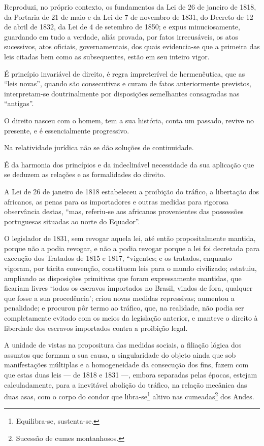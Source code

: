 {\asterisc

Reproduzi, no próprio contexto, os fundamentos da Lei de 26 de janeiro
de 1818, da Portaria de 21 de maio e da Lei de 7 de novembro de 1831, do
Decreto de 12 de abril de 1832, da Lei de 4 de setembro de 1850; e expus
minuciosamente, guardando em tudo a verdade, aliás provada, por fatos
irrecusáveis, os atos sucessivos, atos oficiais, governamentais, dos
quais evidencia-se que a primeira das leis citadas bem como as
subsequentes, estão em seu inteiro vigor.

É princípio invariável de direito, é regra impreterível de hermenêutica,
que as ``leis novas'', quando são consecutivas e curam de fatos
anteriormente previstos, interpretam-se doutrinalmente por disposições
semelhantes consagradas nas ``antigas''.

O direito nasceu com o homem, tem a sua história, conta um passado,
revive no presente, e é essencialmente progressivo.

Na relatividade jurídica não se dão soluções de continuidade.

É da harmonia dos princípios e da indeclinável necessidade da sua
aplicação que se deduzem as relações e as formalidades do direito.

A Lei de 26 de janeiro de 1818 estabeleceu a proibição do tráfico, a
libertação dos africanos, as penas para os importadores e outras medidas
para rigorosa observância destas, ``mas, referiu-se aos africanos
provenientes das possessões portuguesas situadas ao norte do Equador''.

O legislador de 1831, sem revogar aquela lei, até então propositalmente
mantida, porque não a podia revogar, e não a podia revogar porque a lei
foi decretada para execução dos Tratados de 1815 e 1817, ``vigentes; e os %
tratados, enquanto vigoram, por tácita convenção, constituem leis para o
mundo civilizado; estatuiu, ampliando as disposições primitivas que
foram expressamente mantidas, que ficariam livres `todos os escravos
importados no Brasil, vindos de fora, qualquer que fosse a sua
procedência'; criou novas medidas repressivas; aumentou a penalidade; e
procurou pôr termo ao tráfico, que, na realidade, não podia ser
completamente evitado com os meios da legislação anterior, e manteve o
direito à liberdade dos escravos importados contra a proibição legal.

A unidade de vistas na propositura das medidas sociais, a filiação
lógica dos assuntos que formam a sua causa, a singularidade do objeto
ainda que sob manifestações múltiplas e a homogeneidade da consecução
dos fins, fazem com que estas duas leis --- de 1818 e 1831 ---, embora
separadas pelas épocas, estejam calculadamente, para a inevitável
abolição do tráfico, na relação mecânica das duas asas, com o corpo do
condor que libra-se\footnote{Equilibra-se, sustenta-se.} altivo nas
cumeadas\footnote{Sucessão de cumes montanhosos.} dos Andes.

}
